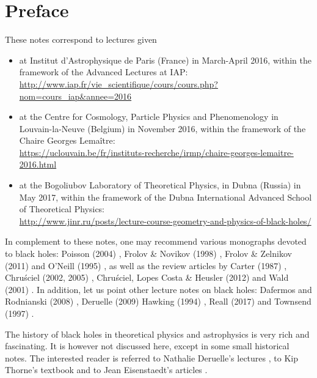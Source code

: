 \chapter*{Preface}

These notes correspond to lectures given
\begin{itemize}
\item at
Institut d'Astrophysique de Paris (France) in March-April 2016, within the
framework of the Advanced Lectures at IAP:\\
\url{http://www.iap.fr/vie_scientifique/cours/cours.php?nom=cours_iap&annee=2016}
\item at the Centre for Cosmology, Particle Physics and Phenomenology in Louvain-la-Neuve
(Belgium) in November 2016, within the framework of the Chaire Georges Lemaître:\\
\url{https://uclouvain.be/fr/instituts-recherche/irmp/chaire-georges-lemaitre-2016.html}
\item at the
Bogoliubov Laboratory of Theoretical Physics, in Dubna (Russia) in May 2017,
within the framework of the Dubna International Advanced School of Theoretical Physics:\\
\url{http://www.jinr.ru/posts/lecture-course-geometry-and-physics-of-black-holes/}
\end{itemize}

\vspace{2ex}

In complement to these notes, one may recommend various monographs
devoted to black holes: Poisson (2004) \cite{Poiss04}, Frolov \& Novikov (1998) \cite{FroloN98},
Frolov \& Zelnikov (2011) \cite{FroloZ11} and O'Neill (1995) \cite{ONeil95}, as well as the review
articles by Carter (1987) \cite{Carte87}, Chru\'sciel (2002, 2005) \cite{Chrus02, Chrus05},
Chru\'sciel, Lopes Costa \& Heusler (2012) \cite{ChrusLH12} and Wald (2001) \cite{Wald01}.
In addition, let us point other lecture notes on black holes:
Dafermos and Rodnianski (2008) \cite{DaferR13},  Deruelle (2009) \cite{Derue09}
Hawking (1994) \cite{Hawki94,HawkiP15}, Reall (2017) \cite{Reall16} and Townsend (1997) \cite{Towns97}.

The history of black holes in theoretical physics and astrophysics is
very rich and fascinating. It is however not discussed here, except in some
small historical notes. The interested
reader is referred to Nathalie Deruelle's lectures \cite{Derue09}, to Kip Thorne's
textbook \cite{Thorn94} and to Jean Eisenstaedt's articles \cite{Eisen82,Eisen93}.


